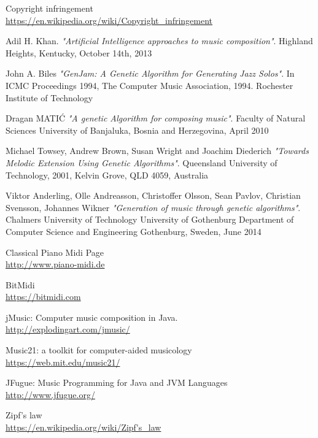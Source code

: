 \documentclass[a4paper]{article}
\begin{document}
\newpage
\begin{thebibliography}{9}


Copyright infringement
\\\url{https://en.wikipedia.org/wiki/Copyright_infringement}

Adil H. Khan. 
\textit{"Artificial Intelligence approaches to music composition"}. 
Highland Heights, Kentucky, October 14th, 2013


John A. Biles 
\textit{"GenJam: A Genetic Algorithm for Generating Jazz Solos"}. 
In ICMC Proceedings 1994, The Computer Music Association, 1994.
Rochester Institute of Technology

Dragan MATIĆ
\textit{"A genetic Algorithm for composing music"}. 
Faculty of Natural Sciences University of Banjaluka, Bosnia and Herzegovina, April 2010



Michael Towsey, Andrew Brown, Susan Wright and Joachim Diederich
\textit{"Towards Melodic Extension Using Genetic Algorithms"}. 
Queensland University of Technology, 2001, Kelvin Grove, QLD 4059, Australia



Viktor Anderling, Olle Andreasson, Christoffer Olsson, Sean Pavlov, Christian Svensson, Johannes Wikner
\textit{"Generation of music through genetic algorithms"}. 
Chalmers University of Technology
University of Gothenburg
Department of Computer Science and Engineering
Gothenburg, Sweden, June 2014



Classical Piano Midi Page 
\\\url{http://www.piano-midi.de}

BitMidi
\\\url{https://bitmidi.com}

jMusic: Computer music composition in Java.
\\\url{http://explodingart.com/jmusic/}

Music21: a toolkit for computer-aided musicology
\\\url{https://web.mit.edu/music21/}

JFugue: Music Programming for Java and JVM Languages 
\\\url{http://www.jfugue.org/}


Zipf's law
\\\url{https://en.wikipedia.org/wiki/Zipf's_law}


\end{thebibliography}
\end{document}
